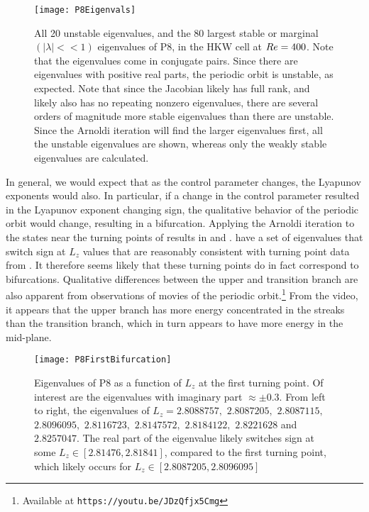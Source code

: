 \begin{figure}[h]
\texttt{[image: P8Eigenvals]}
\caption{All 20 unstable eigenvalues, and the 80 largest stable or marginal $(|\lambda| << 1)$ eigenvalues of P8, in the HKW cell at $Re=400$. Note that the eigenvalues come in conjugate pairs. Since there are eigenvalues with positive real parts, the periodic orbit is unstable, as expected. Note that since the Jacobian likely has full rank, and likely also has no repeating nonzero eigenvalues, there are several orders of magnitude more stable eigenvalues than there are unstable. Since the Arnoldi iteration will find the larger eigenvalues first, all the unstable eigenvalues are shown, whereas only the weakly stable eigenvalues are calculated.}\label{fig:P8Eigenvals}
\end{figure}

In general, we would expect that as the control parameter changes, the Lyapunov exponents would also. In particular, if a change in the control parameter resulted in the Lyapunov exponent changing sign, the qualitative behavior of the periodic orbit would change, resulting in a bifurcation. Applying the Arnoldi iteration to the states near the turning points of  results in  and . 
\clearpage
  have a set of eigenvalues that switch sign at $L_z$ values that are reasonably consistent with turning point data from . It therefore seems likely that these turning points do in fact correspond to bifurcations. Qualitative differences between the upper and transition branch are also apparent from observations of movies of the periodic orbit.\footnote{Available at {\tt https://youtu.be/JDzQfjx5Cmg}} From the video, it appears that the upper branch has more energy concentrated in the streaks than the transition branch, which in turn appears to have more energy in the mid-plane. \\

\begin{figure}[t]
\texttt{[image: P8FirstBifurcation]}
\caption{Eigenvalues of P8 as a function of $L_z$ at the first turning point. Of interest are the eigenvalues with imaginary part $\approx \pm 0.3$. From left to right, the eigenvalues of $L_z = 2.8088757,$ $2.8087205,$ $2.8087115,$ $2.8096095,$ $2.8116723,$ $2.8147572,$ $2.8184122,$ $2.8221628$ and $2.8257047$. The real part of the eigenvalue likely switches sign at some $L_z \in [2.81476,2.81841]$, compared to the first turning point, which likely occurs for $L_z \in [2.8087205, 2.8096095]$  }\label{fig:P8FirstBifurcation}
\end{figure}


